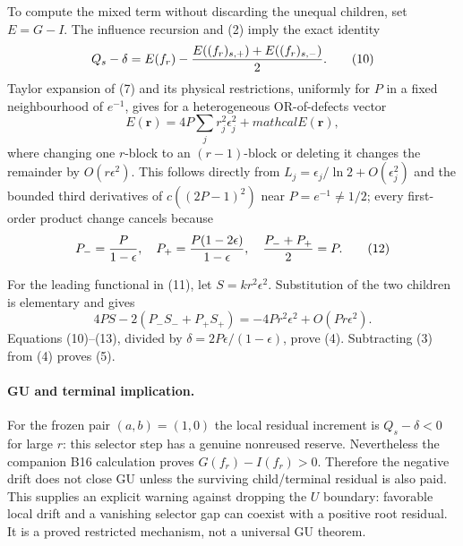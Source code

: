 To compute the mixed term without discarding the unequal children, set
$E=G-I$.  The influence recursion and (2) imply the exact identity
\[
 Q_s-\delta=E(f_r)-{E((f_r)_{s,+})+E((f_r)_{s,-})\over2}. \tag{10}
\]
Taylor expansion of (7) and its physical restrictions, uniformly for
$P$ in a fixed neighbourhood of $e^{-1}$, gives for a heterogeneous
OR-of-defects vector
\[
 E(\mathbf r)=4P\sum_j r_j^2\epsilon_j^2+mathcal E(\mathbf r), \tag{11}
\]
where changing one $r$-block to an $(r-1)$-block or deleting it changes the
remainder by $O(r\epsilon^2)$.  This follows directly from
$L_j=\epsilon_j/\ln2+O(\epsilon_j^2)$ and the bounded third derivatives of
$c((2P-1)^2)$ near $P=e^{-1}\ne1/2$; every first-order product change
cancels because
\[
 P_-={P\over1-\epsilon},\quad
 P_+={P(1-2\epsilon)\over1-\epsilon},\quad
 {P_-+P_+\over2}=P.                                     \tag{12}
\]

For the leading functional in (11), let
$S=kr^2\epsilon^2$.  Substitution of the two children is elementary and
gives
\[
 4PS-2(P_-S_-+P_+S_+)
 =-4Pr^2\epsilon^2+O(Pr\epsilon^2).                     \tag{13}
\]
Equations (10)--(13), divided by
$\delta=2P\epsilon/(1-\epsilon)$, prove (4).  Subtracting (3) from (4)
proves (5).

\paragraph{GU and terminal implication.}
For the frozen pair $(a,b)=(1,0)$ the local residual increment is
$Q_s-\delta<0$ for large $r$: this selector step has a genuine nonreused
reserve.  Nevertheless the companion B16 calculation proves
$G(f_r)-I(f_r)>0$.  Therefore the negative drift does not close GU unless
the surviving child/terminal residual is also paid.  This supplies an
explicit warning against dropping the $U$ boundary: favorable local drift
and a vanishing selector gap can coexist with a positive root residual.
It is a proved restricted mechanism, not a universal GU theorem.

